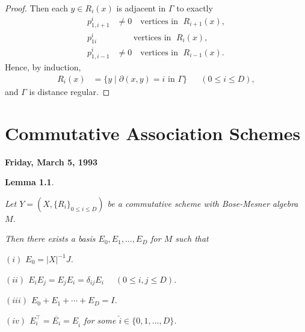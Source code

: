 \documentclass[
]{book}
\newtheorem{lemma}{Lemma}[chapter]
\theoremstyle{definition}
\theoremstyle{definition}
\theoremstyle{definition}
\theoremstyle{definition}
\theoremstyle{remark}
\begin{document}
\begin{proof}
Then each \(y\in R_i(x)\) is adjacent in \(\Gamma\) to exactly
\begin{align}
p^i_{1,i+1} & \neq 0  \quad \text{vertices in }\; R_{i+1}(x),\\
p^i_{1i} & \qquad \text{vertices in }\; R_{i}(x),\\
p^i_{1,i-1} & \neq 0 \quad \text{vertices in }\; R_{i-1}(x).
\end{align}
Hence, by induction,
\begin{align}
R_i(x) & = \{y\mid \partial(x,y) = i \text{ in }\Gamma\} && (0\leq i\leq D),
\end{align}
and \(\Gamma\) is distance regular.

\end{proof}

\hypertarget{lec19}{%
\chapter{Commutative Association Schemes}\label{lec19}}

\textbf{Friday, March 5, 1993}

\begin{lemma}
\protect\hypertarget{lem:ei}{}\label{lem:ei}

Let \(Y = (X, \{R_i\}_{0\leq i\leq D})\) be a commutative scheme with Bose-Mesner algebra \(M\).

Then there exists a basis \(E_0, E_1, \ldots, E_D\) for \(M\) such that

\((i)\) \(E_0 = |X|^{-1}J\).

\((ii)\) \(E_iE_j = E_jE_i = \delta_{ij}E_i\) \(\quad (0\leq i,j\leq D)\).

\((iii)\) \(E_0 + E_1 + \cdots + E_D = I\).

\((iv)\) \(E_i^\top = \overline{E_i} = E_{\hat{i}}\) for some \(\hat{i}\in \{0, 1, \ldots, D\}\).

\end{lemma}
\end{document}
